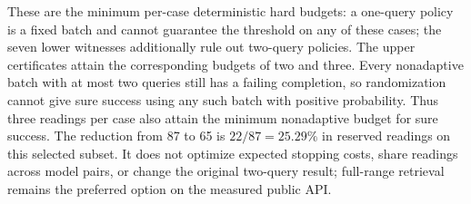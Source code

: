 \documentclass[12pt]{article}
\begin{document}
These are the minimum per-case deterministic hard budgets: a one-query
policy is a fixed batch and cannot guarantee the threshold on any of these
cases; the seven lower witnesses additionally rule out two-query policies.
The upper certificates attain the corresponding budgets of two and three.
Every nonadaptive batch with at most two queries still has a failing
completion, so randomization cannot give sure success using any such batch
with positive probability. Thus three readings per case also attain the
minimum nonadaptive budget for sure success. The reduction from 87 to 65 is
$22/87=25.29\%$ in reserved readings on this selected subset. It does not
optimize expected stopping costs, share readings across model pairs, or
change the original two-query result; full-range retrieval remains the
preferred option on the measured public API.
\FloatBarrier
\end{document}
